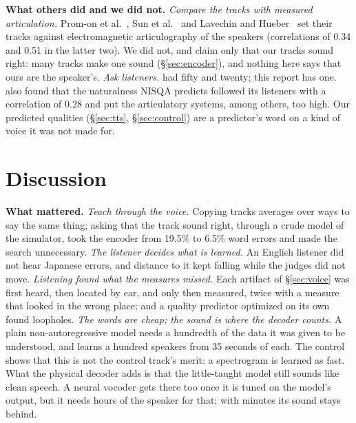 \documentclass[10pt,a4paper,twocolumn]{article}
\begin{document}
\textbf{What others did and we did not.} \emph{Compare the tracks with measured articulation.}
Prom-on et al.~\cite{promon}, Sun et al.~\cite{sun} and Lavechin and Hueber~\cite{lavechin}
set their tracks against electromagnetic articulography of the speakers (correlations of 0.34
and 0.51 in the latter two). We did not, and claim only that our tracks sound right: many
tracks make one sound (\S\ref{sec:encoder}), and nothing here says that ours are the
speaker's. \emph{Ask listeners.} \cite{vtltts} had fifty and \cite{georges} twenty; this report
has one. \cite{vtltts} also found that the naturalness NISQA predicts followed its listeners
with a correlation of 0.28 and put the articulatory systems, among others, too high. Our predicted qualities
(\S\ref{sec:tts}, \S\ref{sec:control}) are a predictor's word on a kind of voice it was not
made for.

\section{Discussion}\label{sec:discussion}
\textbf{What mattered.} \emph{Teach through the voice.} Copying tracks averages over ways to
say the same thing; asking that the track sound right, through a crude model of the simulator,
took the encoder from 19.5\% to 6.5\% word errors and made the search unnecessary. \emph{The
listener decides what is learned.} An English listener did not hear Japanese errors, and
distance to it kept falling while the judges did not move. \emph{Listening found what the measures
missed.} Each artifact of \S\ref{sec:voice} was first heard, then located by ear, and only then
measured, twice with a measure that looked in the wrong place; and a quality predictor optimized
on its own found loopholes. \emph{The words are cheap; the sound is
where the decoder counts.} A plain non-autoregressive model needs a hundredth of the data it
was given to be understood, and learns a hundred speakers from 35 seconds of each. The control
shows that this is not the control track's merit: a spectrogram is learned as fast. What the
physical decoder adds is that the little-taught model still sounds like clean speech. A neural
vocoder gets there too once it is tuned on the model's output, but it needs hours of the
speaker for that; with minutes its sound stays behind.
\end{document}
